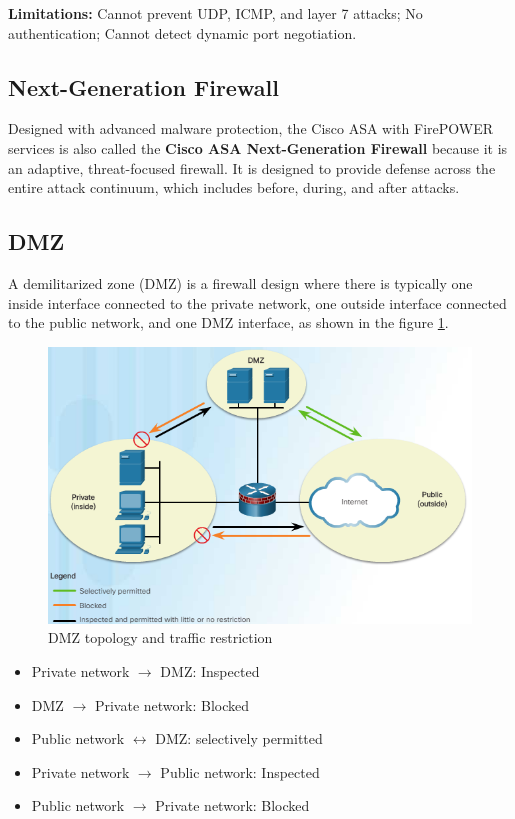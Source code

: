 \textbf{Limitations:} Cannot prevent UDP, ICMP, and layer 7 attacks; No authentication; Cannot detect dynamic port negotiation.

\subsection{Next-Generation Firewall}

Designed with advanced malware protection, the Cisco ASA with FirePOWER services is also called the \textbf{Cisco ASA Next-Generation Firewall} because it is an adaptive, threat-focused firewall. It is designed to provide defense across the entire attack continuum, which includes before, during, and after attacks.

\subsection{DMZ}

A demilitarized zone (DMZ) is a firewall design where there is typically one inside interface connected to the private network, one outside interface connected to the public network, and one DMZ interface, as shown in the figure \ref{DMZfilter}.

\begin{figure}[hbtp]
\caption{DMZ topology and traffic restriction}\label{DMZfilter}
\centering
\includegraphics[width=10\xm]{pictures/DMZfilter.PNG}
\end{figure}

\begin{itemize}
\item Private network $\rightarrow$ DMZ: Inspected 
\item DMZ  $\rightarrow$ Private network: Blocked
\item Public network  $\leftrightarrow$ DMZ: selectively permitted
\item Private network $\rightarrow$ Public network: Inspected
\item Public network $\rightarrow$ Private network: Blocked
\end{itemize}

